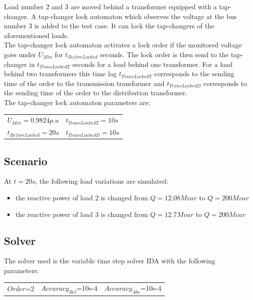 \documentclass[a4paper, 12pt]{report}
\begin{document}
Load number 2 and 3 are moved behind a transformer equipped with a tap-changer. A tap-changer lock automaton which observes the voltage at the bus number 3 is added to the test case. It can lock the tap-changers of the aforementioned loads. \\

The tap-changer lock automaton activates a lock order if the monitored voltage goes under $U_{Min}$ for $t_{BeforeLocked}$ seconds. The lock order is then send to the tap-changer in $t_{TransLockedT}$ seconds for a load behind one transformer. For a load behind two transformers this time lag $t_{TransLockedT}$ corresponds to the sending time of the order to the transmission transformer and $t_{TransLockedD}$ corresponds to the sending time of the order to the distribution transformer. \\

The tap-changer lock automaton parameters are:
\begin{center}
\begin{tabular}{l|l}
   $U_{Min}=0.9824p.u$ & $t_{TransLockedT}=10s$ \\
   $t_{BeforeLocked}=20s$  & $t_{TransLockedD}=10s$ \\
\end{tabular}
\end{center}

\subsection{Scenario}
At $t=20s$, the following load variations are simulated:
\begin{itemize}
\item{the reactive power of load 2 is changed from $Q=12.08Mvar$ to $Q=200Mvar$}
\item{the reactive power of load 3 is changed from $Q=12.7Mvar$ to $Q=200Mvar$}
\end{itemize}

\subsection{Solver}
The solver used is the variable time step solver IDA with the following parameters:
\begin{center}
\begin{tabular}{l|l|l}
   $Order$=2 & $Accuracy_{Rel}$=10e-4 & $Accuracy_{Abs}$=10e-4 \\
\end{tabular}
\end{center}
\end{document}
